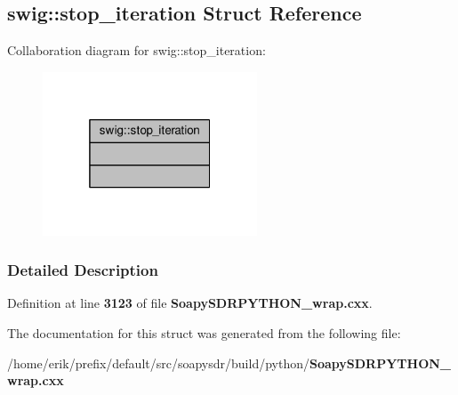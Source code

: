 \subsection{swig\+:\+:stop\+\_\+iteration Struct Reference}
\label{structswig_1_1stop__iteration}


Collaboration diagram for swig\+:\+:stop\+\_\+iteration\+:
\nopagebreak
\begin{figure}[H]
\begin{center}
\leavevmode
\includegraphics[width=181pt]{db/da2/structswig_1_1stop__iteration__coll__graph}
\end{center}
\end{figure}


\subsubsection{Detailed Description}


Definition at line {\bf 3123} of file {\bf Soapy\+S\+D\+R\+P\+Y\+T\+H\+O\+N\+\_\+wrap.\+cxx}.



The documentation for this struct was generated from the following file\+:\begin{DoxyCompactItemize}
\item 
/home/erik/prefix/default/src/soapysdr/build/python/{\bf Soapy\+S\+D\+R\+P\+Y\+T\+H\+O\+N\+\_\+wrap.\+cxx}\end{DoxyCompactItemize}
